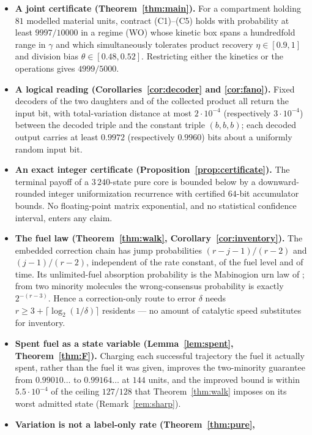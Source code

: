 \documentclass[11pt,a4paper]{article}
\theoremstyle{plain}
\theoremstyle{definition}
\theoremstyle{remark}
\begin{document}
\begin{itemize}[leftmargin=1.2em]
\item \textbf{A joint certificate (Theorem~\ref{thm:main}).} For a compartment holding
  $81$ modelled material units, contract (C1)--(C5) holds with probability at least
  $9997/10000$ in a regime (WO) whose kinetic box spans a hundredfold range in $\gamma$
  and which simultaneously tolerates product recovery
  $\eta\in[0.9,1]$ and division bias $\theta\in[0.48,0.52]$. Restricting either the
  kinetics or the operations gives $4999/5000$.
\item \textbf{A logical reading (Corollaries~\ref{cor:decoder} and \ref{cor:fano}).}
  Fixed decoders of the two daughters and of the collected product all return the input
  bit, with total-variation distance at most $2\cdot 10^{-4}$ (respectively
  $3\cdot10^{-4}$) between the decoded triple and the constant triple $(b,b,b)$; each
  decoded output carries at least $0.9972$ (respectively $0.9960$) bits about a uniformly
  random input bit.
\item \textbf{An exact integer certificate (Proposition~\ref{prop:certificate}).} The
  terminal payoff of a $3\,240$-state pure core is bounded below by a downward-rounded
  integer uniformization recurrence with certified $64$-bit accumulator bounds. No
  floating-point matrix exponential, and no statistical confidence interval, enters any
  claim.
\item \textbf{The fuel law (Theorem~\ref{thm:walk}, Corollary~\ref{cor:inventory}).} The
  embedded correction chain has jump probabilities $(r-j-1)/(r-2)$ and $(j-1)/(r-2)$,
  independent of the rate constant, of the fuel level and of time. Its unlimited-fuel
  absorption probability is the Mabinogion urn law of \citet{flajolet2008}; from two
  minority molecules the wrong-consensus probability is exactly $2^{-(r-3)}$. Hence a
  correction-only route to error $\delta$ needs $r\ge 3+\lceil\log_2(1/\delta)\rceil$
  residents --- no amount of catalytic speed substitutes for inventory.
\item \textbf{Spent fuel as a state variable (Lemma~\ref{lem:spent},
  Theorem~\ref{thm:F}).} Charging each successful trajectory the fuel it actually spent,
  rather than the fuel it was given, improves the two-minority guarantee from
  $0.99010\ldots$ to $0.99164\ldots$ at $144$ units, and the improved bound is within
  $5.5\cdot 10^{-4}$ of the ceiling $127/128$ that Theorem~\ref{thm:walk} imposes on its
  worst admitted state (Remark~\ref{rem:sharp}).
\item \textbf{Variation is not a label-only rate (Theorem~\ref{thm:pure},
}
\end{itemize}
\end{document}
